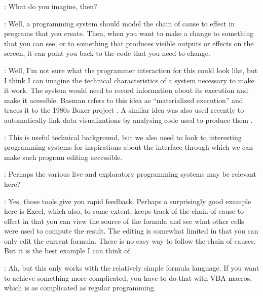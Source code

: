 \documentclass[runningheads]{llncs}
\newcommand{\T}{Tomas}
\newcommand{\J}{Joel}
\newcommand{\says}[2][gg]{\vspace{0.5em}\noindent\hangindent=0.5cm{\textsc{#1}}: #2}
\begin{document}
\says[\T]{What do you imagine, then?}

\says[\J]{Well, a programming system should model the chain of cause to effect in programs that you create. Then, when you want to make a change to something that you can see, or to something that produces visible outputs or effects on the screen, it can point you back to the code that you need to change.}

\says[\T]{Well, I'm not sure what the programmer interaction for this could look like, but I think I can imagine the technical characteristics of a system necessary to make it work. The system would need to record information about its execution and make it acessible. Basman \cite{basman-2022-materialized} refers to this idea as ``materialized execution'' and traces it to the 1980s Boxer project \cite{disessa-1986-boxer}. A similar idea was also used recently to automatically link data visualizations by analysing code used to produce them \cite{perera-2022-galois}.}

\says[\J]{This is useful technical background, but we also need to look to interesting programming systems for inspirations about the interface through which we can make such program editing accessible.}

\says[\T]{Perhaps the various live and exploratory programming systems \cite{rein-2018-live} may be relevant here?}

\says[\J]{Yes, those tools give you rapid feedback. Perhaps a surprisingly good example here is Excel, which also, to some extent, keeps track of the chain of cause to effect in that you can view the source of the formula and see what other cells were used to compute the result. The editing is somewhat limited in that you can only edit the current formula. There is no easy way to follow the chain of causes. But it is the best example I can think of.}

\says[\T]{Ah, but this only works with the relatively simple formula language. If you want to achieve something more complicated, you have to do that with VBA macros, which is as complicated as regular programming. }
\end{document}
